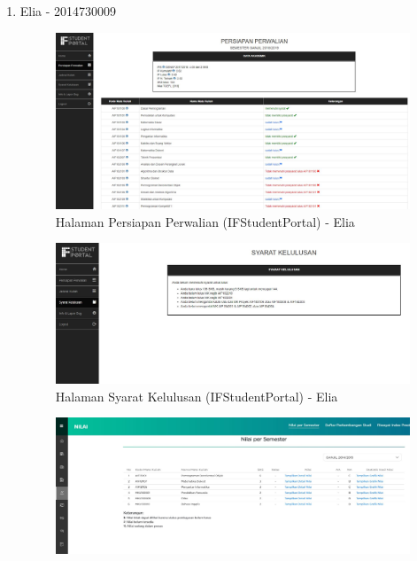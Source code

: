 \begin{itemize}
\begin{enumerate}
		\item Elia - 2014730009
		\begin{figure}[H]
			\centering
			\includegraphics[scale=0.35]{Gambar/HasilPengujian/2014_2_persiapan_perwalian_ifstudentportal}
			\caption{Halaman Persiapan Perwalian (IFStudentPortal) - Elia}
			\label{fig:2014_2_persiapan_perwalian_ifstudentportal}
		\end{figure}
		\begin{figure}[H]
			\centering
			\includegraphics[scale=0.35]{Gambar/HasilPengujian/2014_2_syarat_kelulusan_ifstudentportal}
			\caption{Halaman Syarat Kelulusan (IFStudentPortal) - Elia}
			\label{fig:2014_2_syarat_kelulusan_ifstudentportal}
		\end{figure}
		\begin{figure}[H]
			\centering
			\includegraphics[scale=0.35]{Gambar/HasilPengujian/2014_2_nps_studentportal}

\end{figure}
\end{enumerate}
\end{itemize}
